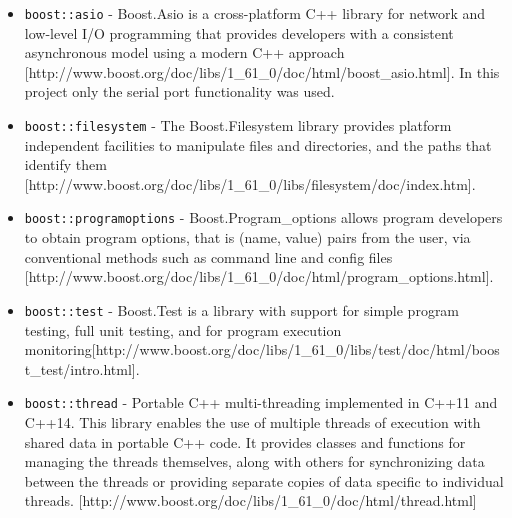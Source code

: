 \begin{itemize}
\item \texttt{boost::asio} - Boost.Asio is a cross-platform C++ library for network and low-level I/O programming that provides developers with a consistent asynchronous model using a modern C++ approach [http://www.boost.org/doc/libs/1\_61\_0/doc/html/boost\_asio.html]. In this project only the serial port functionality was used.
\item \texttt{boost::filesystem} - The Boost.Filesystem library provides platform independent facilities to manipulate files and directories, and the paths that identify them [http://www.boost.org/doc/libs/1\_61\_0/libs/filesystem/doc/index.htm].
\item \texttt{boost::programoptions} - Boost.Program\_options allows program developers to obtain program options, that is (name, value) pairs from the user, via conventional methods such as command line and config files [http://www.boost.org/doc/libs/1\_61\_0/doc/html/program\_options.html]. 
\item \texttt{boost::test} - Boost.Test is a library with support for simple program testing, full unit testing, and for program execution monitoring[http://www.boost.org/doc/libs/1\_61\_0/libs/test/doc/html/boost\_test/intro.html].
\item \texttt{boost::thread} - Portable C++ multi-threading implemented in C++11 and C++14. This library  enables the use of multiple threads of execution with shared data in portable C++ code. It provides classes and functions for managing the threads themselves, along with others for synchronizing data between the threads or providing separate copies of data specific to individual threads. [http://www.boost.org/doc/libs/1\_61\_0/doc/html/thread.html]
\end{itemize}
